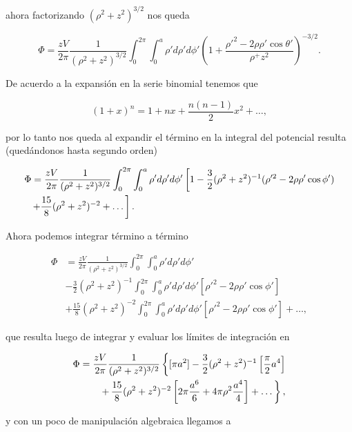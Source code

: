 \documentclass[a4paper,10pt]{article}
\numberwithin{equation}{section}
\newcommand{\zerodel}{.\kern-\nulldelimiterspace}
\begin{document}
ahora factorizando $(\rho^2 + z^2)^{3/2}$ nos queda 

\begin{equation}
 \Phi = \frac{zV}{2\pi}\frac{1}{(\rho^2 + z^2)^{3/2}} 
 \int_0^{2\pi}\int_0^a  \rho'd\rho'd\phi' 
 \left(1 + \frac{\rho'^2 - 2\rho\rho'\cos{\theta'}}{\rho^+z^2}\right)^{-3/2}.
\end{equation}

De acuerdo a la expansión en la serie binomial tenemos que 

\begin{equation}
 (1 + x)^n = 1 + nx + \frac{n(n-1)}{2}x^2 + \dots,
\end{equation}

por lo tanto nos queda al expandir el término en la integral del 
potencial resulta (quedándonos hasta segundo orden)

\begin{align*}
 \Phi &= \frac{zV}{2\pi}\frac{1}{(\rho^2 + z^2)^{3/2}} \int_0^{2\pi} 
 \int_0^a \rho'd\rho'd\phi' \left[1 - \frac{3}{2}(\rho^2 + z^2)^{-1} 
 (\rho'^2 - 2\rho\rho'\cos{\phi'})\right\zerodel \\
 &\left\zerodel + \frac{15}{8}(\rho^2 + z^2)^{-2} + \dots \right].
\end{align*}

Ahora podemos integrar término a término 

\begin{align*}
 \Phi &= \frac{zV}{2\pi}\frac{1}{(\rho^2 + z^2)^{3/2}}\int_0^{2\pi}
 \int_0^a \rho'd\rho'd\phi' \\
 &- \frac{3}{2}(\rho^2 + z^2)^{-1} 
 \int_0^{2\pi} \int_0^a \rho'd\rho'd\phi' [\rho'^2 - 2\rho\rho'\cos{\phi}'] \\
 &+ \frac{15}{8}(\rho^2 + z^2)^{-2} 
 \int_0^{2\pi}\int_0^a \rho'd\rho'd\phi' [\rho'^2 - 2\rho\rho'\cos{\phi}']
 + \dots,
\end{align*}

que resulta luego de integrar y evaluar los límites de integración 
en 

\begin{align*}
  \Phi = \frac{zV}{2\pi} \frac{1}{(\rho^2 + z^2)^{3/2}}\left\{[\pi a^2] - 
 \frac{3}{2}(\rho^2 + z^2)^{-1}\left[\frac{\pi}{2}a^4 \right]\right\zerodel \\
 + \left\zerodel \frac{15}{8}(\rho^2 + z^2)^{-2}\left[2\pi\frac{a^6}{6} + 
 4\pi\rho^2\frac{a^4}{4}\right] + \dots \right\},
\end{align*}

y con un poco de manipulación algebraica llegamos a 
\end{document}
